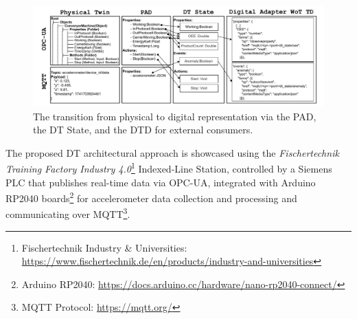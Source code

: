 \begin{figure}[t]
    \setlength{\belowcaptionskip}{-13pt}
    \centering
    \includegraphics[width=\textwidth]{figures/dt-interoperability/dt_interoperability-pad_dt_wot.pdf}
    \caption{The transition from physical to digital representation via the \ac{PAD}, the \ac{DT} State, and the \ac{DTD} for external consumers.}
    \label{fig:pad_dt_wot}
\end{figure}

The proposed \ac{DT} architectural approach is showcased using the \emph{Fischertechnik Training Factory Industry 4.0}\footnote{Fischertechnik Industry \& Universities: \url{https://www.fischertechnik.de/en/products/industry-and-universities}} Indexed-Line Station, controlled by a Siemens PLC that publishes real-time data via OPC-UA, integrated with Arduino RP2040 boards\footnote{Arduino RP2040: \url{https://docs.arduino.cc/hardware/nano-rp2040-connect/}} for accelerometer data collection and processing and communicating over MQTT\footnote{MQTT Protocol: \url{https://mqtt.org/}}.

